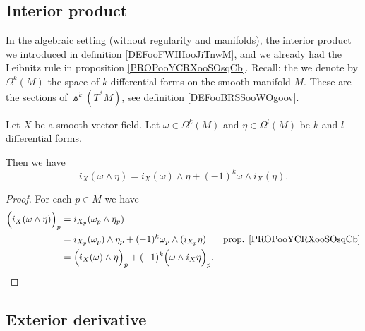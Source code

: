 \subsection{Interior product}

In the algebraic setting (without regularity and manifolds), the interior product we introduced in definition \ref{DEFooFWIHooJiTnwM}, and we already had the Leibnitz rule in proposition \ref{PROPooYCRXooSOsqCb}. Recall: the we denote by \( \Omega^k(M)\) the space of \( k\)-differential forms on the smooth manifold \( M\). These are the sections of \( \Wedge^k(T^*M)\), see definition \ref{DEFooBRSSooWOgoov}.

\begin{proposition}		\label{PROPooIQIUooTDNJdB}
	Let \( X\) be a smooth vector field. Let \( \omega\in \Omega^k(M)\) and \( \eta\in \Omega^l(M)\) be \( k\) and \( l\) differential forms.

	Then we have
	\begin{equation}
		i_X(\omega\wedge \eta)=i_X(\omega)\wedge \eta+(-1)^k\omega\wedge i_X(\eta).
	\end{equation}
\end{proposition}

\begin{proof}
	For each \( p\in M\) we have
	\begin{subequations}
		\begin{align}
			\Big( i_X(\omega\wedge \eta) \Big)_p & = i_{X_p}(\omega_p\wedge \eta_p)                                                                                         \\
			                                     & = i_{X_p}(\omega_p)\wedge\eta_p+(-1)^k\omega_p\wedge(i_{X_p}\eta)                & \text{prop. \ref{PROPooYCRXooSOsqCb}} \\
			                                     & = \Big( i_X(\omega)\wedge \eta \Big)_p+(-1)^k\Big( \omega\wedge i_X\eta \Big)_p.
		\end{align}
	\end{subequations}
\end{proof}


\subsection{Exterior derivative}

